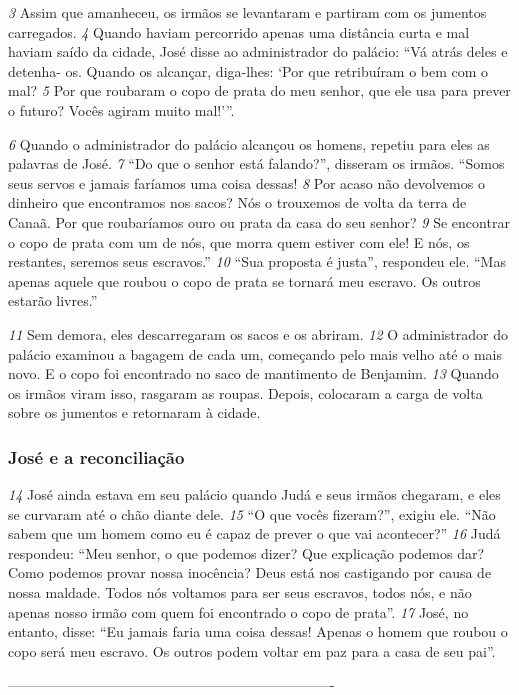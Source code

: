 \bigskip   
\textit{\tiny 3}
Assim que amanheceu, os irmãos se levantaram e partiram com os jumentos
carregados. 
\textit{\tiny 4} 
Quando haviam percorrido apenas uma distância curta e mal haviam
saído da cidade, José disse ao administrador do palácio: “Vá atrás deles e detenha-
os. Quando os alcançar, diga-lhes: ‘Por que retribuíram o bem com o mal? 
\textit{\tiny 5} 
Por
que roubaram o copo de prata
 do meu senhor, que ele usa para prever o futuro?
Vocês agiram muito mal!’”. 

\bigskip   
\textit{\tiny 6}
Quando o administrador do palácio alcançou os homens, repetiu para eles as
palavras de José. 
\textit{\tiny 7}
“Do   que o senhor está falando?”, disseram os irmãos. “Somos seus servos e
jamais faríamos uma coisa dessas! 
\textit{\tiny 8}
Por acaso não devolvemos o dinheiro que
encontramos nos sacos? Nós o trouxemos de volta da terra de Canaã. Por que
roubaríamos ouro ou prata da casa do seu senhor? 
\textit{\tiny 9} 
Se encontrar o copo de prata
com um de nós, que morra quem estiver com ele! E nós, os restantes, seremos seus
escravos.”
\textit{\tiny 10}
“Sua proposta é justa”, respondeu ele. “Mas apenas aquele que roubou o copo
de prata se tornará meu escravo. Os outros estarão livres.”

\bigskip   
\textit{\tiny 11}
Sem demora, eles descarregaram os sacos e os abriram. 
\textit{\tiny 12}
O administrador
do palácio examinou a bagagem de cada um, começando pelo mais velho até o
mais novo. E o copo foi encontrado no saco de mantimento de Benjamim.
\textit{\tiny 13}
Quando os irmãos viram isso, rasgaram as roupas. Depois, colocaram a carga de
volta sobre os jumentos e retornaram à cidade.

\bigskip   
\subsubsection*{José e a reconciliação}
\textit{\tiny 14}
José ainda estava em seu palácio quando Judá e seus irmãos chegaram, e eles
se curvaram até o chão diante dele. 
\textit{\tiny 15}
“O que vocês fizeram?”, exigiu ele. “Não
sabem que um homem como eu é capaz de prever o que vai acontecer?”
\textit{\tiny 16}
Judá respondeu: “Meu senhor, o que podemos dizer? Que explicação
podemos dar? Como podemos provar nossa inocência? Deus está nos castigando
por causa de nossa maldade. Todos nós voltamos para ser seus escravos, todos
nós, e não apenas nosso irmão com quem foi encontrado o copo de prata”.
\textit{\tiny 17}
José, no entanto, disse: “Eu jamais faria uma coisa dessas! Apenas o homem
que roubou o copo será meu escravo. Os outros podem voltar em paz para a casa
de seu pai”.



----------------------------------------------------------------------
